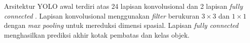 Arsitektur YOLO awal terdiri atas 24 lapisan konvolusional dan 2 lapisan
\textit{fully connected} \cite{redmon2016you}. Lapisan konvolusional
menggunakan \textit{filter} berukuran $3 \times 3$ dan $1 \times 1$ dengan
\textit{max pooling} untuk mereduksi dimensi spasial. Lapisan
\textit{fully connected} menghasilkan prediksi akhir kotak pembatas dan kelas
objek.




